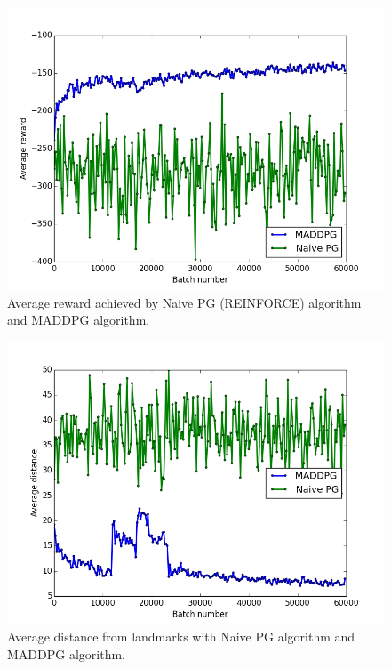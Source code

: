 \documentclass{article}
\begin{document}
\begin{figure}
\begin{center}
\includegraphics[scale=0.4]{MADDPGvsPG}
\end{center}
\caption{Average reward achieved by Naive PG (REINFORCE) algorithm and MADDPG algorithm.}
\label{fig:MADDPGvsPG}
\end{figure}

\begin{figure}
\begin{center}
\includegraphics[scale=0.4]{MADDPGvsPG_distance}
\end{center}
\caption{Average distance from landmarks with Naive PG algorithm and MADDPG algorithm.}
\label{fig:MADDPGvsPG_distance}
\end{figure}
\end{document}
